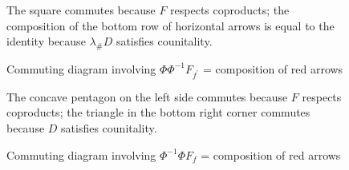 \begin{landscape}
\begin{figure}
{{}}
\caption{Commuting diagram 
involving $\Phi\Phi^{-1}F_{f^\prime}$
= composition of red arrows}
  \label{fig:phi_phi-1}
The square commutes because $F$ 
respects coproducts; 
the composition of the bottom row 
of horizontal arrows is equal to 
the identity because $\lambda_\#D$ 
satisfies counitality.
\end{figure}
%
\begin{figure}
\centerline{
\xymatrixrowsep{5pc}
\xymatrixcolsep{5pc}
}
\caption{Commuting diagram 
involving $\Phi^{-1}\Phi F_f$
= composition of red arrows}
  \label{fig:phi-1_phi}
The concave pentagon on the left 
side commutes because $F$ 
respects coproducts; the triangle in the 
bottom right corner commutes 
because $D$ satisfies counitality.
\end{figure}
\end{landscape}